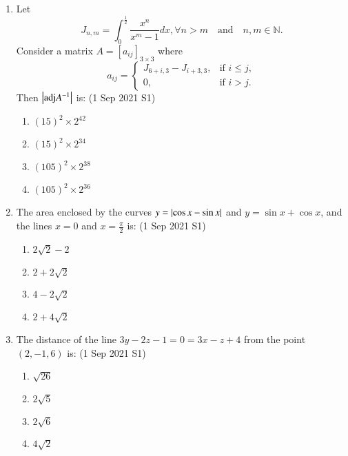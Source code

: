 \documentclass[journal]{IEEEtran}
\begin{document}
\begin{enumerate}
    \item Let 
    $$
    J_{n,m} = \int_0^\frac{1}{2} \frac{x^n}{x^m-1} dx, \forall n > m \quad \text{and} \quad n, m \in \mathbb{N}.
    $$
    Consider a matrix $A = [a_{ij}]_{3 \times 3}$ where 
    $$
    a_{ij} = \begin{cases} 
    J_{6+i,3} - J_{i+3,3}, & \text{if } i \leq j, \\
    0, & \text{if } i > j.
    \end{cases}
    $$
    Then $\left\vert\text{adj} A^{-1}\right\vert$ is: \hfill (1 Sep 2021 S1)
    \begin{multicols}{4}
        \begin{enumerate}
            \item $(15)^2 \times 2^{42}$
            \item $(15)^2 \times 2^{34}$
            \item $(105)^2 \times 2^{38}$
            \item $(105)^2 \times 2^{36}$
        \end{enumerate}
    \end{multicols}

    \item The area enclosed by the curves $y = \left\vert\cos x - \sin x\right\vert$ and $y = \sin x + \cos x$, and the lines $x = 0$ and $x = \frac{\pi}{2}$ is: \hfill (1 Sep 2021 S1)
    \begin{multicols}{4}
        \begin{enumerate}
            \item $2\sqrt{2} - 2$
            \item $2 + 2\sqrt{2}$
            \item $4 - 2\sqrt{2}$
            \item $2 + 4\sqrt{2}$
        \end{enumerate}
    \end{multicols}

    \item The distance of the line $3y - 2z - 1 = 0 = 3x - z + 4$ from the point $(2, -1, 6)$ is: \hfill (1 Sep 2021 S1)
    \begin{multicols}{4}
        \begin{enumerate}
            \item $\sqrt{26}$
            \item $2\sqrt{5}$
            \item $2\sqrt{6}$
            \item $4\sqrt{2}$
        \end{enumerate}
    \end{multicols}


\end{enumerate}
\end{document}

